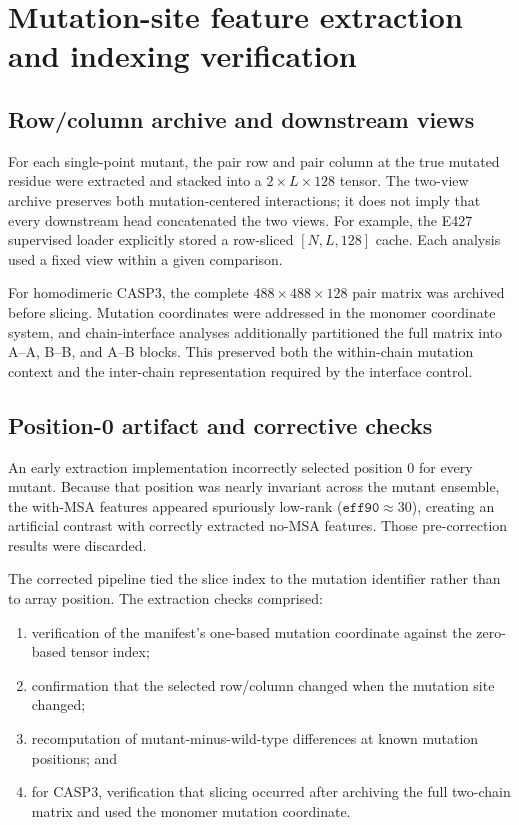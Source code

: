 \documentclass[10pt,a4paper]{article}
\begin{document}
\section{Mutation-site feature extraction and indexing verification}

\subsection{Row/column archive and downstream views}

For each single-point mutant, the pair row and pair column at the true mutated residue were extracted and stacked into a $2\times L\times128$ tensor. The two-view archive preserves both mutation-centered interactions; it does not imply that every downstream head concatenated the two views. For example, the E427 supervised loader explicitly stored a row-sliced $[N,L,128]$ cache. Each analysis used a fixed view within a given comparison.

For homodimeric CASP3, the complete $488\times488\times128$ pair matrix was archived before slicing. Mutation coordinates were addressed in the monomer coordinate system, and chain-interface analyses additionally partitioned the full matrix into A--A, B--B, and A--B blocks. This preserved both the within-chain mutation context and the inter-chain representation required by the interface control.

\subsection{Position-0 artifact and corrective checks}

An early extraction implementation incorrectly selected position 0 for every mutant. Because that position was nearly invariant across the mutant ensemble, the with-MSA features appeared spuriously low-rank ($\texttt{eff90}\approx30$), creating an artificial contrast with correctly extracted no-MSA features. Those pre-correction results were discarded.

The corrected pipeline tied the slice index to the mutation identifier rather than to array position. The extraction checks comprised:

\begin{enumerate}
    \item verification of the manifest's one-based mutation coordinate against the zero-based tensor index;
    \item confirmation that the selected row/column changed when the mutation site changed;
    \item recomputation of mutant-minus-wild-type differences at known mutation positions; and
    \item for CASP3, verification that slicing occurred after archiving the full two-chain matrix and used the monomer mutation coordinate.
\end{enumerate}
\end{document}
